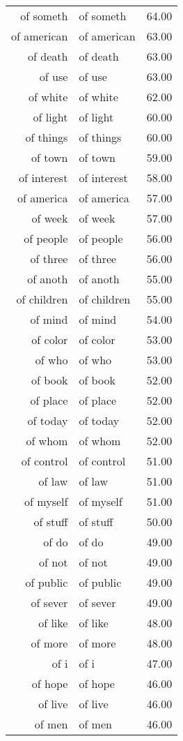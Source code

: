 \begin{table}[ht]
\begin{tabular}{rlr}
  of someth & of someth & 64.00 \\ 
  of american & of american & 63.00 \\ 
  of death & of death & 63.00 \\ 
  of use & of use & 63.00 \\ 
  of white & of white & 62.00 \\ 
  of light & of light & 60.00 \\ 
  of things & of things & 60.00 \\ 
  of town & of town & 59.00 \\ 
  of interest & of interest & 58.00 \\ 
  of america & of america & 57.00 \\ 
  of week & of week & 57.00 \\ 
  of people & of people & 56.00 \\ 
  of three & of three & 56.00 \\ 
  of anoth & of anoth & 55.00 \\ 
  of children & of children & 55.00 \\ 
  of mind & of mind & 54.00 \\ 
  of color & of color & 53.00 \\ 
  of who & of who & 53.00 \\ 
  of book & of book & 52.00 \\ 
  of place & of place & 52.00 \\ 
  of today & of today & 52.00 \\ 
  of whom & of whom & 52.00 \\ 
  of control & of control & 51.00 \\ 
  of law & of law & 51.00 \\ 
  of myself & of myself & 51.00 \\ 
  of stuff & of stuff & 50.00 \\ 
  of do & of do & 49.00 \\ 
  of not & of not & 49.00 \\ 
  of public & of public & 49.00 \\ 
  of sever & of sever & 49.00 \\ 
  of like & of like & 48.00 \\ 
  of more & of more & 48.00 \\ 
  of i & of i & 47.00 \\ 
  of hope & of hope & 46.00 \\ 
  of live & of live & 46.00 \\ 
  of men & of men & 46.00 \\ 

\end{tabular}
\end{table}
